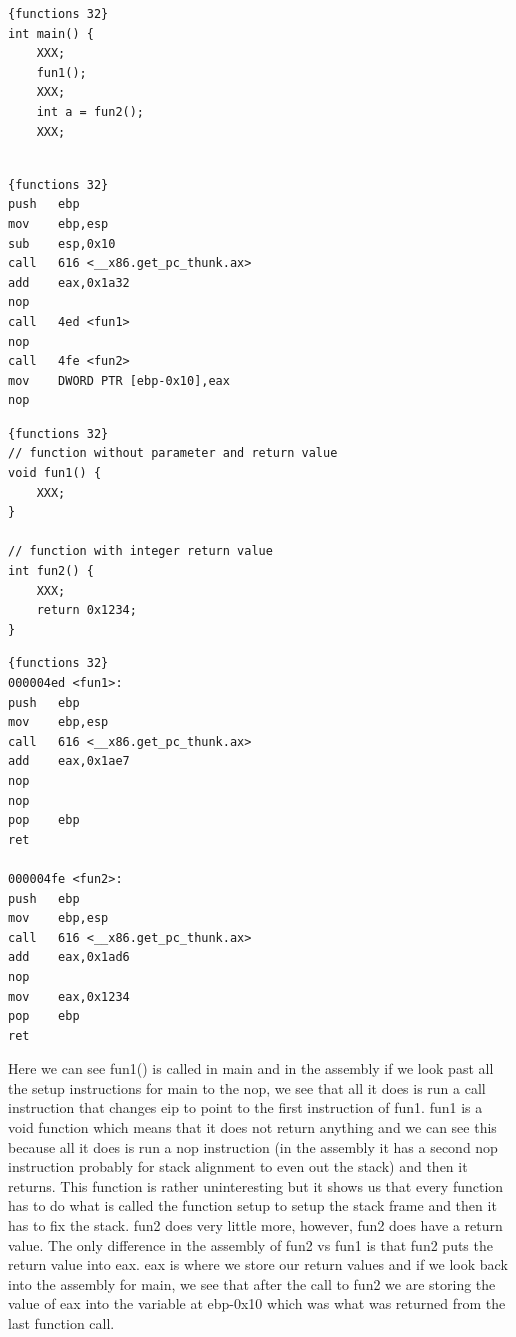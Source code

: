 \documentclass{report}
\begin{document}
\begin{minipage}{.45\textwidth}
\begin{lstlisting}[caption=Function calls,frame=tlrb]{functions 32}
int main() {
    XXX;
    fun1();
    XXX;
    int a = fun2();
    XXX;


\end{lstlisting}
\end{minipage}\hfill
\begin{minipage}{.45\textwidth}
\begin{lstlisting}[caption=assembly 32bit (Main),frame=tlrb]{functions 32}
push   ebp
mov    ebp,esp
sub    esp,0x10
call   616 <__x86.get_pc_thunk.ax>
add    eax,0x1a32
nop
call   4ed <fun1>
nop
call   4fe <fun2>
mov    DWORD PTR [ebp-0x10],eax
nop
\end{lstlisting}
\end{minipage}
\begin{minipage}{.45\textwidth}
\begin{lstlisting}[caption=Function code (fun1 and fun2),frame=tlrb,framexrightmargin=-15pt]{functions 32}
// function without parameter and return value
void fun1() {
    XXX;
}

// function with integer return value
int fun2() {
    XXX;
    return 0x1234;
}

\end{lstlisting}
\end{minipage}
\begin{minipage}{.45\textwidth}
\begin{lstlisting}[caption=assembly 32bit (fun1 and fun2),frame=tlrb]{functions 32}
000004ed <fun1>:
push   ebp
mov    ebp,esp
call   616 <__x86.get_pc_thunk.ax>
add    eax,0x1ae7
nop
nop
pop    ebp
ret    

000004fe <fun2>:
push   ebp
mov    ebp,esp
call   616 <__x86.get_pc_thunk.ax>
add    eax,0x1ad6
nop
mov    eax,0x1234
pop    ebp
ret    

\end{lstlisting}
\end{minipage}
 \newline
Here we can see fun1() is called in main and in the assembly if we look past all the setup instructions for main to the nop, we see that all it does is run a call instruction that changes eip to point to the first instruction of fun1.  fun1 is a void function which means that it does not return anything and we can see this because all it does is run a nop instruction (in the assembly it has a second nop instruction probably for stack alignment to even out the stack) and then it returns.  This function is rather uninteresting but it shows us that every function has to do what is called the function setup to setup the stack frame and then it has to fix the stack.  fun2 does very little more, however, fun2 does have a return value.  The only difference in the assembly of fun2 vs fun1 is that fun2 puts the return value into eax.  eax is where we store our return values and if we look back into the assembly for main, we see that after the call to fun2 we are storing the value of eax into the variable at ebp-0x10 which was what was returned from the last function call.\newline
\end{document}
